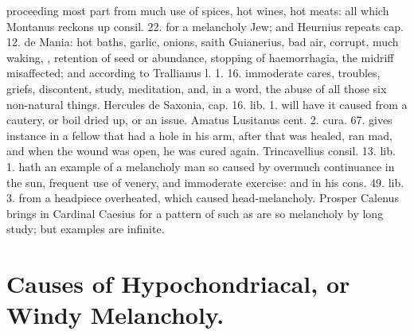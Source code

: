 {proceeding most part from much use of spices, hot wines, hot
meats: all which Montanus reckons up consil. 22. for a melancholy Jew;
and Heurnius repeats cap. 12. de Mania: hot baths, garlic, onions,
saith Guianerius, bad air, corrupt, much waking, \etc{}, retention
of seed or abundance, stopping of haemorrhagia, the midriff
misaffected; and according to Trallianus l. 1. 16. immoderate cares,
troubles, griefs, discontent, study, meditation, and, in a word, the
abuse of all those six non-natural things. Hercules de Saxonia, cap.
16. lib. 1. will have it caused from a cautery, or boil dried up,
or an issue. Amatus Lusitanus cent. 2. cura. 67. gives instance in a
fellow that had a hole in his arm, after that was healed, ran
mad, and when the wound was open, he was cured again. Trincavellius
consil. 13. lib. 1. hath an example of a melancholy man so caused by
overmuch continuance in the sun, frequent use of venery, and immoderate
exercise: and in his cons. 49. lib. 3. from a headpiece
overheated, which caused head-melancholy. Prosper Calenus brings in
Cardinal Caesius for a pattern of such as are so melancholy by long
study; but examples are infinite.

\section{Causes of Hypochondriacal, or Windy Melancholy.}

}

